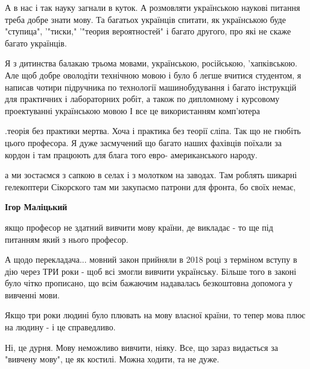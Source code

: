 \begin{itemize}
А в нас і так науку загнали в куток. А
розмовляти українською наукові питання треба добре знати мову. Та багатьох
українців спитати, як українською буде "ступица", '"тиски," '"теория
вероятностей" і багато другого, про які не скаже багато українців. 

Я з дитинства балакаю трьома мовами, українською, російською, 'хапківською. Але
щоб добре оволодіти технічною мовою і було б легше вчитися студентом, я написав
чотири підручника по технології машинобудування і багато інструкцій для
практичних і лабораторних робіт, а також по дипломному і курсовому проектуванні
українською мовою І все це використанням комп'ютера

.теорія без практики мертва. Хоча і практика без теорії сліпа. Так що не
гнобіть цього професора. Я дуже засмучений що багато наших фахівців поїхали за
кордон і там працюють для блага того евро- американського народу.

а ми зостаємся з сапкою в селах і з молотком на заводах. Там роблять шикарні
гелекоптери Сікорского там ми закупаємо патрони для фронта, бо своїх немає,

\begin{itemize}
 
\textbf{Ігор Маліцький} 

якщо професор не здатний вивчити мову країни, де викладає - то ще під питанням
який з нього професор.

А щодо перекладача... мовний закон прийняли в 2018 році з терміном вступу в дію
через ТРИ роки - щоб всі змогли вивчити українську. Більше того в законі було
чітко прописано, що всім бажаючим надавалась безкоштовна допомога у вивченні
мови.

Якщо три роки людині було плювать на мову власної країни, то тепер мова плює на
людину - і це справедливо.


 

Ні, це дурня. Мову неможливо вивчити, ніяку. Все, що зараз видається за
"вивчену мову", це як костилі. Можна ходити, та не дуже.



\end{itemize}
\end{itemize}
